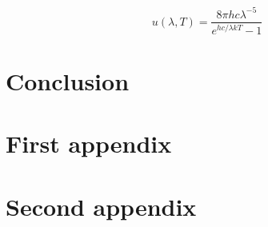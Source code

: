 \documentclass[12pt]{article}
\begin{document}
\begin{equation}
    u(\lambda,T)=\frac{8\pi hc\lambda^{-5}}{e^{hc/\lambda kT}-1}
    \label{eq:1}
\end{equation}

\section{Conclusion}

\lipsum[1] \cite{refs1, refs2, refs3}




\appendix  
\clearpage
\addappheadtotoc 
\appendixpage 

\section{First appendix}

\lipsum[1]

\section{Second appendix}

\lipsum[1]
\end{document}
